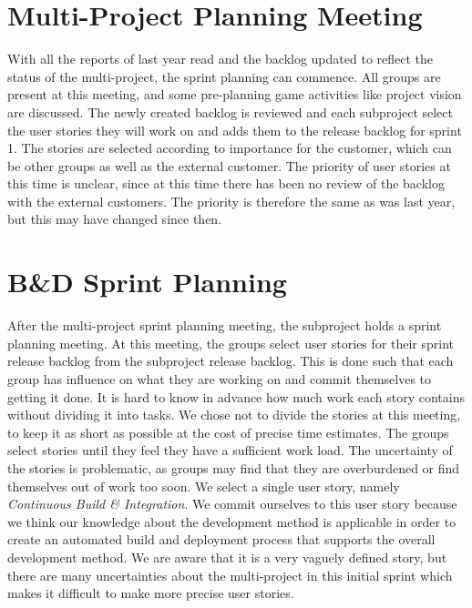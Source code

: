 \section{Multi-Project Planning Meeting}\label{sec:s1p_multiproject}
With all the reports of last year read and the backlog updated to reflect the status of the multi-project, the sprint planning can commence. All groups are present at this meeting, and some pre-planning game activities like project vision are discussed. The newly created backlog is reviewed and each subproject select the user stories they will work on and adds them to the release backlog for sprint 1. The stories are selected according to importance for the customer, which can be other groups as well as the external customer. The priority of user stories at this time is unclear, since at this time there has been no review of the backlog with the external customers. The priority is therefore the same as was last year, but this may have changed since then.

\section{B\&D Sprint Planning}\label{sec:s1p_bd}
After the multi-project sprint planning meeting, the \bd subproject holds a sprint planning meeting. At this meeting, the \bd groups select user stories for their sprint release backlog from the \bd subproject release backlog. This is done such that each group has influence on what they are working on and commit themselves to getting it done. It is hard to know in advance how much work each story contains without dividing it into tasks. We chose not to divide the stories at this meeting, to keep it as short as possible at the cost of precise time estimates. The groups select stories until they feel they have a sufficient work load. The uncertainty of the stories is problematic, as groups may find that they are overburdened or find themselves out of work too soon. We select a single user story, namely \emph{Continuous Build \& Integration}. We commit ourselves to this user story because we think our knowledge about the development method is applicable in order to create an automated build and deployment process that supports the overall development method. We are aware that it is a very vaguely defined story, but there are many uncertainties about the multi-project in this initial sprint which makes it difficult to make more precise user stories.

